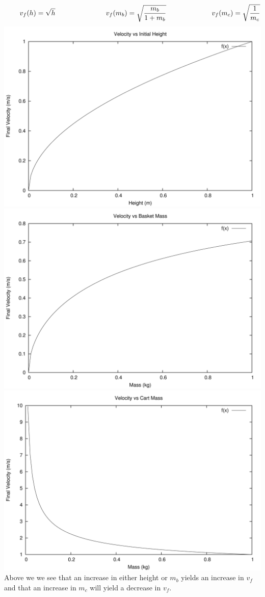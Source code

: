 \documentclass[12pt,letterpaper]{article}
\begin{document}
\begin{equation}
\hspace{0.3in}v_f(h) = \sqrt{h} \hspace{1.0in} v_f(m_b) = \sqrt{\frac{m_b}{1 + m_b}}\hspace{0.9in} v_f(m_c) = \sqrt{\frac{1}{m_c}}\nonumber
\end{equation}
\includegraphics[scale=0.41]{h.png}
\includegraphics[scale=0.41]{mb.png}
\includegraphics[scale=0.41]{mc.png}
\newline\newline
Above we we see that an increase in either height or \(m_b\) yields an increase in \(v_f\) and that an increase in \(m_c\) will yield a decrease in \(v_f\).
\end{document}
